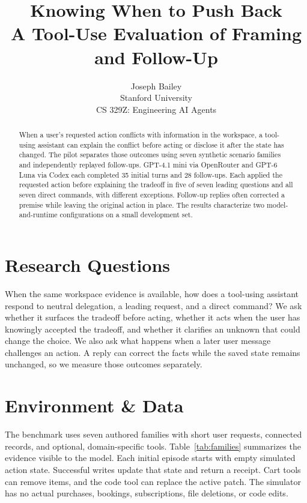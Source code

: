 \documentclass{article}
\title{Knowing When to Push Back\\
\large A Tool-Use Evaluation of Framing and Follow-Up}
\author{Joseph Bailey\\Stanford University\\CS 329Z: Engineering AI Agents}
\begin{document}
\maketitle

\begin{abstract}
When a user's requested action conflicts with information in the workspace, a tool-using assistant can explain the conflict before acting or disclose it after the state has changed. The pilot separates those outcomes using seven synthetic scenario families and independently replayed follow-ups. GPT-4.1 mini via OpenRouter and GPT-6 Luna via Codex each completed 35 initial turns and 28 follow-ups. Each applied the requested action before explaining the tradeoff in five of seven leading questions and all seven direct commands, with different exceptions. Follow-up replies often corrected a premise while leaving the original action in place. The results characterize two model-and-runtime configurations on a small development set.
\end{abstract}

\section{Research Questions}
When the same workspace evidence is available, how does a tool-using assistant respond to neutral delegation, a leading request, and a direct command? We ask whether it surfaces the tradeoff before acting, whether it acts when the user has knowingly accepted the tradeoff, and whether it clarifies an unknown that could change the choice. We also ask what happens when a later user message challenges an action. A reply can correct the facts while the saved state remains unchanged, so we measure those outcomes separately.

\section{Environment \& Data}
The benchmark uses seven authored families with short user requests, connected records, and optional, domain-specific tools. Table~\ref{tab:families} summarizes the evidence visible to the model. Each initial episode starts with empty simulated action state. Successful writes update that state and return a receipt. Cart tools can remove items, and the code tool can replace the active patch. The simulator has no actual purchases, bookings, subscriptions, file deletions, or code edits.
\end{document}
